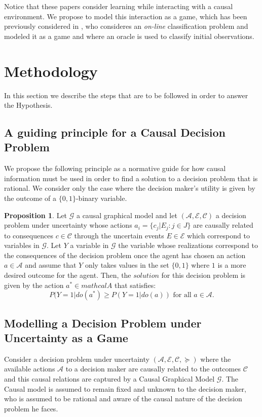 \documentclass[english,letterpaper,12pt,final]{article}
\theoremstyle{definition}
\newtheorem{prop}{Proposition}[section]
\begin{document}
Notice that these papers consider learning while interacting with a causal environment. We propose to model this interaction as a game, which has been previously considered in \cite{werling2015job}, who consideres an \textit{on-line} classification problem and modeled it as a game and where an oracle is used to classify initial observations.

\newpage
\section{Methodology}
In this section we describe the steps that are to be followed in order to answer the Hypothesis.
\subsection{A guiding principle for a Causal Decision Problem}
We propose the following principle as a normative guide for how causal information must be used in order to find a solution to a decision problem that is rational. We consider only the case where the decision maker's utility is given by the outcome of a $\{0,1 \}$-binary variable.
\begin{prop}
Let  $\mathcal{G}$ a causal graphical model and let $(\mathcal{A},\mathcal{E},\mathcal{C})$ a decision problem under uncertainty whose actions $a_i = \{ c_j | E_j : j \in J \}$  are causally related to consequences $c \in \mathcal{C}$ through the uncertain events $E \in \mathcal{E}$ which correspond to variables in $\mathcal{G}$. Let $Y$ a variable in $\mathcal{G}$ the variable whose realizations correspond to the consequences of the decision problem once the agent has chosen an action $a \in \mathcal{A}$ and assume that $Y$ only takes values in the set $\{ 0,1\}$ where $1$ is a more desired outcome for the agent. Then, the $\textit{solution}$ for this decision problem is given by the action $a^\ast \in mathcal{A}$ that satisfies:
\[ P(Y=1 | do(a^\ast) \geq P(Y=1 | do(a)) \textrm{ for all } a \in \mathcal{A}. \]
\end{prop}
\subsection{Modelling a Decision Problem under Uncertainty as a Game}
Consider a decision problem under uncertainty $(\mathcal{A},\mathcal{E},\mathcal{C},\succeq)$ where the available actions $\mathcal{A}$ to a decision maker are causally related to the outcomes $\mathcal{C}$ and this causal relations are captured by a Causal Graphical Model $\mathcal{G}$. The Causal model is assumed to remain fixed and unknown to the decision maker, who is assumed to be rational and aware of the causal nature of the decision problem he faces.  
\end{document}
